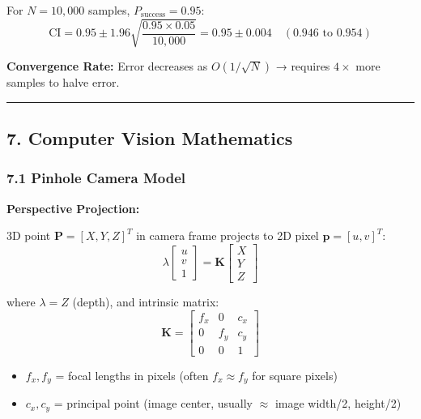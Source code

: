 \documentclass[
]{article}
\providecommand{\tightlist}{%
  \setlength{\itemsep}{0pt}\setlength{\parskip}{0pt}}
\begin{document}
For \(N = 10,000\) samples, \(P_{\text{success}} = 0.95\): \[
\text{CI} = 0.95 \pm 1.96 \sqrt{\frac{0.95 \times 0.05}{10,000}} = 0.95 \pm 0.004 \quad (0.946 \text{ to } 0.954)
\]

\textbf{Convergence Rate:} Error decreases as \(O(1/\sqrt{N})\) →
requires \(4\times\) more samples to halve error.

\begin{center}\rule{0.5\linewidth}{0.5pt}\end{center}

\hypertarget{computer-vision-mathematics}{%
\subsection{7. Computer Vision
Mathematics}\label{computer-vision-mathematics}}

\hypertarget{pinhole-camera-model}{%
\subsubsection{7.1 Pinhole Camera Model}\label{pinhole-camera-model}}

\textbf{Perspective Projection:}

3D point \(\mathbf{P} = [X, Y, Z]^T\) in camera frame projects to 2D
pixel \(\mathbf{p} = [u, v]^T\): \[
\lambda
\begin{bmatrix} u \\ v \\ 1 \end{bmatrix}
=
\mathbf{K}
\begin{bmatrix} X \\ Y \\ Z \end{bmatrix}
\]

where \(\lambda = Z\) (depth), and intrinsic matrix: \[
\mathbf{K} =
\begin{bmatrix}
f_x & 0 & c_x \\
0 & f_y & c_y \\
0 & 0 & 1
\end{bmatrix}
\]

\begin{itemize}
\tightlist
\item
  \(f_x, f_y\) = focal lengths in pixels (often \(f_x \approx f_y\) for
  square pixels)
\item
  \(c_x, c_y\) = principal point (image center, usually \(\approx\)
  image width/2, height/2)
\end{itemize}
\end{document}
